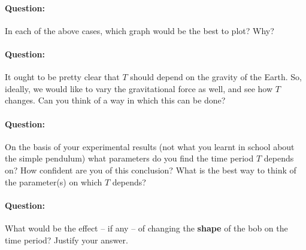 \begin{question}
\paragraph{Question:} In each of the above cases, which graph would be the best to plot? Why?~\\

\paragraph{Question:} It ought to be pretty clear that $T$ should depend on the gravity of the Earth. So, ideally, we would like to vary the gravitational force as well, and see how $T$ changes. Can you think of a way in which this can be done?~\\

\paragraph{Question:} On the basis of your experimental results (not what you learnt in school about the simple pendulum) what parameters do you find the time period $T$ depends on? How confident are you of this conclusion? What is the best way to think of the parameter(s) on which $T$ depends?~\\

\paragraph{Question:} What would be the effect -- if any -- of changing the \textbf{shape} of the bob on the time period? Justify your answer.
\end{question}












\newpage